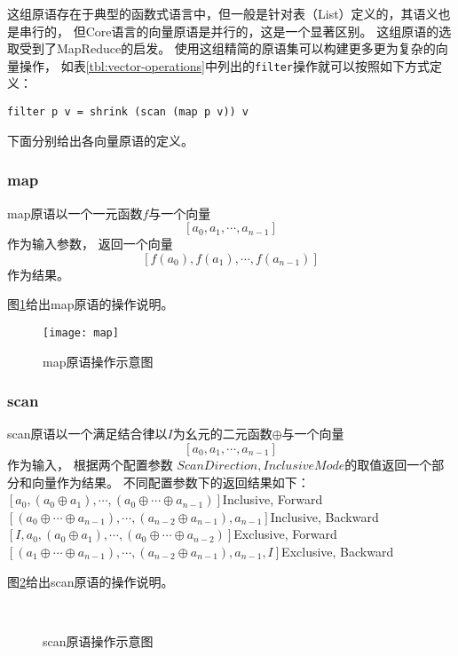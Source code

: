 这组原语存在于典型的函数式语言中，但一般是针对表（List）定义的，其语义也是串行的，
但Core语言的向量原语是并行的，这是一个显著区别。
这组原语的选取受到了MapReduce的启发。
使用这组精简的原语集可以构建更多更为复杂的向量操作，
如表\ref{tbl:vector-operations}中列出的\texttt{filter}操作就可以按照如下方式定义：\\
\centerline{\texttt{filter p v = shrink (scan (map p v)) v}}

下面分别给出各向量原语的定义。
\subsubsection{map}
\begin{definition}
  map原语以一个一元函数$f$与一个向量$$[a_0, a_1, \cdots, a_{n-1}]$$作为输入参数，
  返回一个向量$$[f(a_0), f(a_1), \cdots, f(a_{n-1})]$$作为结果。
\end{definition}

图\ref{fig:map-diagram}给出map原语的操作说明。
\begin{figure}[h]
  \centering
  \texttt{[image: map]}
  \caption{map原语操作示意图}
  \label{fig:map-diagram}
\end{figure}

\subsubsection{scan}
\begin{definition}
  scan原语以一个满足结合律以$I$为幺元的二元函数$\oplus$与一个向量$$[a_0, a_1, \cdots, a_{n-1}]$$作为输入，
  根据两个配置参数  $ScanDirection, InclusiveMode$的取值返回一个部分和向量作为结果。
  不同配置参数下的返回结果如下：\\
  $[a_0, (a_0\oplus{}a_1), \cdots, (a_0\oplus{}\cdots\oplus{}a_{n-1})]$\hfill{}Inclusive, Forward\\
  $[(a_0\oplus\cdots\oplus{}a_{n-1}), \cdots, (a_{n-2}\oplus{}a_{n-1}), a_{n-1}]$\hfill{}Inclusive, Backward\\
  $[I, a_0, (a_0\oplus{}a_1), \cdots, (a_0\oplus{}\cdots\oplus{}a_{n-2})]$\hfill{}Exclusive, Forward\\
  $[(a_1\oplus\cdots\oplus{}a_{n-1}), \cdots, (a_{n-2}\oplus{}a_{n-1}), a_{n-1}, I]$\hfill{}Exclusive, Backward\\
\end{definition}

图\ref{fig:scan-diagram}给出scan原语的操作说明。
\begin{figure}[h]
  \centering
  \\
  \caption{scan原语操作示意图}
  \label{fig:scan-diagram}
\end{figure}

